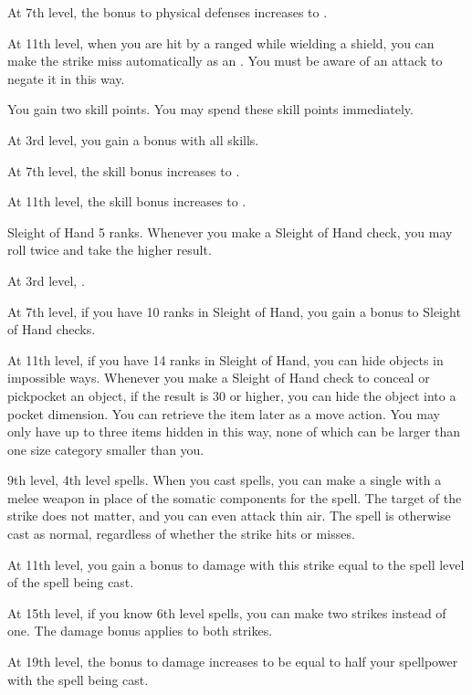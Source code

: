     At 7th level, the bonus to physical defenses increases to .

    At 11th level, when you are hit by a ranged  while wielding a shield, you can make the strike miss automatically as an .
    You must be aware of an attack to negate it in this way.

    \featben You gain two skill points.
    You may spend these skill points immediately.

    At 3rd level, you gain a  bonus with all skills.

    At 7th level, the skill bonus increases to .

    At 11th level, the skill bonus increases to .

    \featpre Sleight of Hand 5 ranks.
    \featben Whenever you make a Sleight of Hand check, you may roll twice and take the higher result.

    At 3rd level, \tdash.

    At 7th level, if you have 10 ranks in Sleight of Hand, you gain a  bonus to Sleight of Hand checks.

    At 11th level, if you have 14 ranks in Sleight of Hand, you can hide objects in impossible ways.
    Whenever you make a Sleight of Hand check to conceal or pickpocket an object, if the result is 30 or higher, you can hide the object into a pocket dimension.
    You can retrieve the item later as a move action.
    You may only have up to three items hidden in this way, none of which can be larger than one size category smaller than you.

    \featpres 9th level, 4th level spells.
    \featben When you cast spells, you can make a single  with a melee weapon in place of the somatic components for the spell.
    The target of the strike does not matter, and you can even attack thin air.
    The spell is otherwise cast as normal, regardless of whether the strike hits or misses.

    At 11th level, you gain a bonus to damage with this strike equal to the spell level of the spell being cast.

    At 15th level, if you know 6th level spells, you can make two strikes instead of one.
    The damage bonus applies to both strikes.

    At 19th level, the bonus to damage increases to be equal to half your spellpower with the spell being cast.

